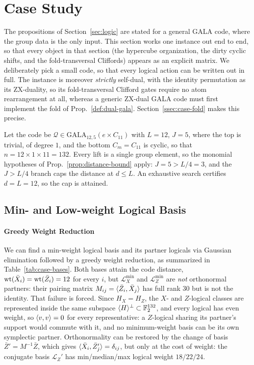 \section{Case Study}\label{sec:case-study}

The propositions of Section~\ref{sec:logic} are stated for a general GALA code, where the group data is the only input.  This section works one instance out end to end, so that every object in that section (the hypercube organization, the dirty cyclic shifts, and the fold-transversal Cliffords) appears as an explicit matrix.  We deliberately pick a small code, so that every logical action can be written out in full.  The instance is moreover \emph{strictly} self-dual, with the identity permutation as its ZX-duality, so its fold-transversal Clifford gates require no atom rearrangement at all, whereas a generic ZX-dual GALA code must first implement the fold of Prop.~\ref{def:dual-gala}.  Section~\ref{ssec:case-fold} makes this precise.

Let the code be $\mathcal{Q}\in\mathrm{GALA}_{12,5}(e\times C_{11})$ with $L=12$, $J=5$, where the top is trivial, of degree $1$, and the bottom $C_m=C_{11}$ is cyclic, so that $n=12\times1\times11=132$.  Every lift is a single group element, so the monomial hypotheses of Prop.~\ref{prop:distance-bound} apply: $J=5>L/4=3$, and the $J>L/4$ branch caps the distance at $d\leq L$.  An exhaustive search certifies $d=L=12$, so the cap is attained.  


\subsection{Min- and Low-weight Logical Basis}\label{ssec:case-chains}

\paragraph{Greedy Weight Reduction} We can find a min-weight logical basis and its partner logicals via Gaussian elimination followed by a greedy weight reduction, as summarized in Table~\ref{tab:case-bases}.  Both bases attain the code distance, $\mathrm{wt}(\bar X_i)=\mathrm{wt}(\bar Z_i)=12$ for every $i$, but $\mathcal{L}_X^{\min}$ and $\mathcal{L}_Z^{\min}$ are \emph{not} orthonormal partners: their pairing matrix $M_{ij}=\braket{\bar Z_i,\bar X_j}$ has full rank $30$ but is not the identity.  That failure is forced.  Since $H_X=H_Z$, the $X$- and $Z$-logical classes are represented inside the same subspace $\langle H \rangle^\perp\subset\mathbb{F}_2^{132}$, and every logical has even weight, so $\braket{v,v}=0$ for every representative: a $Z$-logical sharing its partner's support would commute with it, and no minimum-weight basis can be its own symplectic partner.  Orthonormality can be restored by the change of basis $\bar Z'=M^{-1}\bar Z$, which gives $\braket{\bar X_i,\bar Z'_j}=\delta_{ij}$, but only at the cost of weight: the conjugate basis $\mathcal{L}_Z'$ has min/median/max logical weight $18/22/24$.

